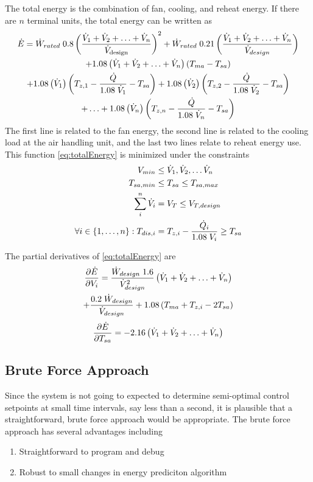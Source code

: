 The total energy is the combination of fan, cooling, and reheat energy. If there are \(n\) terminal units, the total energy can be written as
\begin{multline}\label{eq:totalEnergy}
    \dot{E}_{}=\dot{W}_{rated}\;0.8 \left(\frac{\dot{V}_{1}+\dot{V}_{2}+\ldots+\dot{V}_{n}}{\dot{V}_{\text{design}}} \right)^2 + \dot{W}_{rated}\;0.21 \left(\frac{\dot{V}_{1}+\dot{V}_{2}+\ldots+\dot{V}_{n}}{\dot{V}_{design}} \right)\\
+1.08\left(\dot{V}_{1}+\dot{V}_{2}+\ldots+\dot{V}_{n} \right)\left(T_{ma}-T_{sa} \right)\\
+1.08\left(\dot{V}_{1} \right)\left(T_{z,1}-\frac{\dot{Q}}{1.08\; \dot{V}_{1}} -T_{sa}\right) +1.08\left(\dot{V}_{2} \right)\left(T_{z,2}-\frac{\dot{Q}}{1.08\; \dot{V}_{2}} -T_{sa}\right)\\ 
+\ldots+1.08\left(\dot{V}_{n} \right)\left(T_{z,n}-\frac{\dot{Q}}{1.08\; \dot{V}_{n}} -T_{sa}\right) 
\end{multline}
The first line is related to the fan energy, the second line is related to the cooling load at the air handling unit, and the last two lines relate to reheat energy use. 
This function \ref{eq:totalEnergy} is minimized under the constraints
\begin{align}
    V_{min}&\leq \dot{V}_{1}, \dot{V}_{2}, \ldots \dot{V}_{n} \\
T_{sa,min}&\leq T_{sa} \leq T_{sa,max} \\
    \sum_i^n \dot{V}_{i} &= V_T \leq V_{T,design} \\
\forall i\in\left\{1,\ldots,n\right\}: T_{dis,i} &= T_{z,i} - \frac{\dot{Q}_i}{1.08\;V_i} \geq T_{sa}
\end{align}

The partial derivatives of \ref{eq:totalEnergy} are 
\begin{multline}
    \pdv{\dot{E}}{V_i}=\frac{\dot{W}_{design}\;1.6}{\dot{V}_{design}^2} \left(\dot{V}_{1}+\dot{V}_{2}+\ldots+\dot{V}_{n} \right)\\ 
    +\frac{0.2\;\dot{W}_{design}}{\dot{V}_{design}}+ 1.08\left(T_{ma}+T_{z,i} -2T_{sa}\right)
\end{multline}
\begin{equation}
    \pdv{\dot{E}}{T_{sa}}=-2.16\left(\dot{V}_{1}+\dot{V}_{2}+\ldots+\dot{V}_{n} \right)
\end{equation}

\subsection{Brute Force Approach}

Since the system is not going to expected to determine semi-optimal control setpoints at small time intervals, say less than a second, it is plausible that a straightforward, brute force approach would be appropriate.
The brute force approach has several advantages including
\begin{enumerate}
        \item Straightforward to program and debug
        \item Robust to small changes in energy prediciton algorithm 
\end{enumerate}

